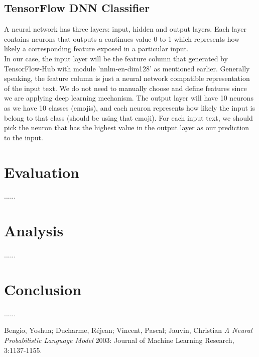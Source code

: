 \documentclass[12pt]{article}
\begin{document}
\subsection{TensorFlow DNN Classifier}
A neural network has three layers: input, hidden and output layers. Each layer contains neurons that outputs a continues value 0 to 1 which represents how likely a corresponding feature exposed in a particular input.
\medskip \\
In our case, the input layer will be the feature column that generated by TensorFlow-Hub with module 'nnlm-en-dim128' as mentioned earlier. Generally speaking, the feature column is just a neural network compatible representation of the input text. We do not need to manually choose and define features since we are applying deep learning mechanism. The output layer will have 10 neurons as we have 10 classes (emojis), and each neuron represents how likely the input is belong to that class (should be using that emoji). For each input text, we should pick the neuron that has the highest value in the output layer as our prediction to the input.

\section{Evaluation}
......

\section{Analysis}
......

\section{Conclusion}
......


\begin{thebibliography}{99}

 Bengio, Yoshua; Ducharme, Réjean; Vincent, Pascal; Jauvin, Christian {\em A Neural Probabilistic Language Model} 2003: Journal of Machine Learning Research, 3:1137-1155.

\end{thebibliography}
  
\end{document}
